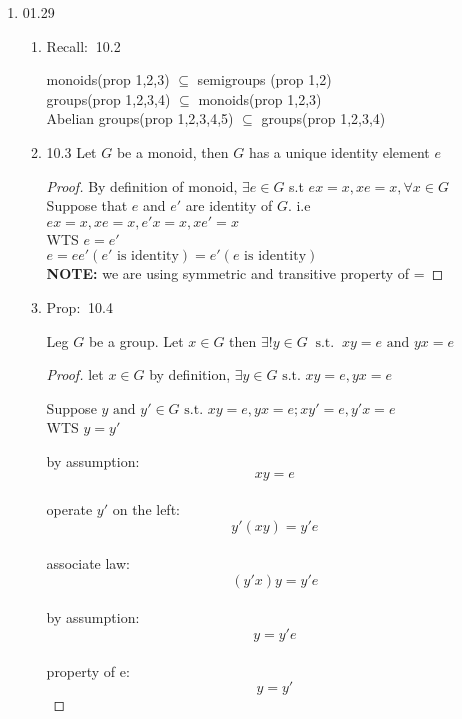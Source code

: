\documentclass[12pt]{article}
\newcommand{\recall}{{\color{blue} Recall: $\ $}}
\newcommand{\prop}{{\color{blue} Prop: $\ $}}
\begin{document}
\begin{enumerate}
\begin{enumerate}
\begin{enumerate}
\begin{enumerate}
            \end{enumerate}

        \end{enumerate}
    \end{enumerate} 
    \item 01.29
    \begin{enumerate}
        \item \recall 10.2
        
        monoids(prop 1,2,3) $\subseteq$ semigroups (prop 1,2) \\
        groups(prop 1,2,3,4) $\subseteq$ monoids(prop 1,2,3) \\
        Abelian groups(prop 1,2,3,4,5) $\subseteq$ groups(prop 1,2,3,4) \\

        \item 10.3 Let $G$ be a monoid, then $G$ has a unique identity element $e$
        \begin{proof}
            By definition of monoid, $\exists e \in G$ s.t $ex = x, xe = x, \forall x \in G$\\
            Suppose that $e$ and $e'$ are identity of $G$. i.e $ex = x, xe = x, e'x = x, xe' = x$\\
            WTS $e = e'$\\
            $e = e e' (e' \text{ is identity}) = e' (e \text{ is identity})$\\
            \textbf{NOTE:} we are using symmetric and transitive property of =
        \end{proof}

        \item \prop 10.4
        
        Leg $G$ be a group. Let $x \in G$ then $\exists ! y \in G \ \text{ s.t. } \ xy = e \text{ and } yx = e$

        \begin{proof}
            let $x \in G$ by definition, $\exists y \in G \text{ s.t. } xy = e, yx = e$

            Suppose $y \text{ and } y' \in G \text{ s.t. } xy = e, yx = e; xy' = e, y'x = e$\\
            WTS $y = y'$

            by assumption: $$xy = e$$\\
            operate $y'$ on the left: $$y'(xy) = y'e$$\\
            associate law: $$(y'x)y = y'e$$\\
            by assumption:$$y = y'e$$\\
            property of e:$$y = y'$$


\end{proof}
\end{enumerate}
\end{enumerate}
\end{document}
